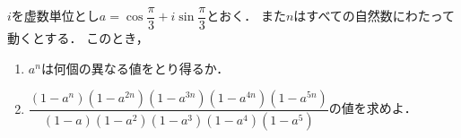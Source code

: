 \documentclass[../../main.tex]{subfiles}
\begin{document}
$i$を虚数単位とし$\displaystyle a=\cos\dfrac{\pi}{3}+i\sin\dfrac{\pi}{3}$とおく．
また$n$はすべての自然数にわたって動くとする．
このとき，
\begin{enumerate}
  \item $a^n$は何個の異なる値をとり得るか．
  \item $\displaystyle\dfrac{(1-a^n)(1-a^{2n})(1-a^{3n})(1-a^{4n})(1-a^{5n})}
    {(1-a)(1-a^2)(1-a^3)(1-a^4)(1-a^5)}$の値を求めよ．
\end{enumerate}
\end{document}
